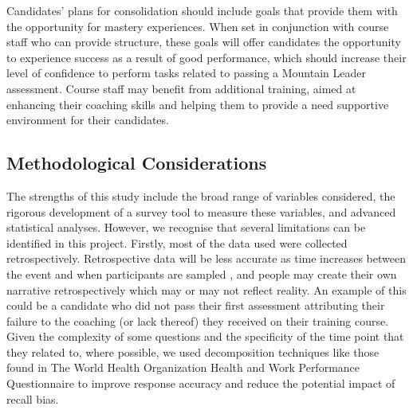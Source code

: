 \documentclass[
  12pt,
  a4paper,
]{book}
\begin{document}
Candidates' plans for consolidation should include goals that provide them with the opportunity for mastery experiences. When set in conjunction with course staff who can provide structure, these goals will offer candidates the opportunity to experience success as a result of good performance, which should increase their level of confidence to perform tasks related to passing a Mountain Leader assessment. Course staff may benefit from additional training, aimed at enhancing their coaching skills and helping them to provide a need supportive environment for their candidates.

\hypertarget{methodological-considerations}{%
\subsection{Methodological Considerations}\label{methodological-considerations}}

The strengths of this study include the broad range of variables considered, the rigorous development of a survey tool to measure these variables, and advanced statistical analyses. However, we recognise that several limitations can be identified in this project. Firstly, most of the data used were collected retrospectively. Retrospective data will be less accurate as time increases between the event and when participants are sampled \citep{Hopwood2013}, and people may create their own narrative retrospectively which may or may not reflect reality. An example of this could be a candidate who did not pass their first assessment attributing their failure to the coaching (or lack thereof) they received on their training course. Given the complexity of some questions and the specificity of the time point that they related to, where possible, we used decomposition techniques like those found in The World Health Organization Health and Work Performance Questionnaire \citep[HPQ;][]{Kessler2003a} to improve response accuracy and reduce the potential impact of recall bias.
\end{document}
